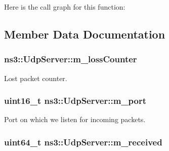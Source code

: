 Here is the call graph for this function\+:




\subsection{Member Data Documentation}
\subsubsection[{\texorpdfstring{m\+\_\+loss\+Counter}{m_lossCounter}}]{ ns3\+::\+Udp\+Server\+::m\+\_\+loss\+Counter\hspace{0.3cm}{\ttfamily [private]}}\hypertarget{classns3_1_1UdpServer_a8b6e5ac841368b11e9458045fc4896b0}{}\label{classns3_1_1UdpServer_a8b6e5ac841368b11e9458045fc4896b0}


Lost packet counter. 

\subsubsection[{\texorpdfstring{m\+\_\+port}{m_port}}]{\setlength{\rightskip}{0pt plus 5cm}uint16\+\_\+t ns3\+::\+Udp\+Server\+::m\+\_\+port\hspace{0.3cm}{\ttfamily [private]}}\hypertarget{classns3_1_1UdpServer_a2b8a2fdb49222a11c987c346cb84e5ee}{}\label{classns3_1_1UdpServer_a2b8a2fdb49222a11c987c346cb84e5ee}


Port on which we listen for incoming packets. 

\subsubsection[{\texorpdfstring{m\+\_\+received}{m_received}}]{\setlength{\rightskip}{0pt plus 5cm}uint64\+\_\+t ns3\+::\+Udp\+Server\+::m\+\_\+received\hspace{0.3cm}{\ttfamily [private]}}\hypertarget{classns3_1_1UdpServer_ac4e5a1da93444bc7b0a8bcdf66337518}{}\label{classns3_1_1UdpServer_ac4e5a1da93444bc7b0a8bcdf66337518}


